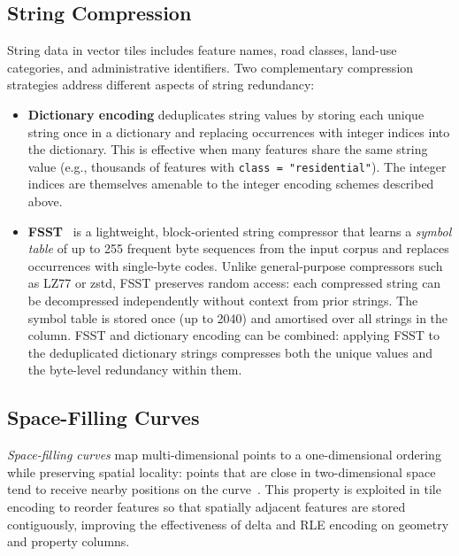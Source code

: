 \subsection{String Compression}\label{sub_string_compression}

String data in vector tiles includes feature names, road classes, land-use categories, and administrative identifiers.
Two complementary compression strategies address different aspects of string redundancy:

\begin{itemize}
    \item \textbf{Dictionary encoding} deduplicates string values by storing each unique string once in a dictionary and replacing occurrences with integer indices into the dictionary.
    This is effective when many features share the same string value (e.g., thousands of features with \texttt{class = "residential"}).
    The integer indices are themselves amenable to the integer encoding schemes described above.

    \item \textbf{\acf{FSST}}~\cite{bonczFSSTFastRandom2020} is a lightweight, block-oriented string compressor that learns a \emph{symbol table} of up to 255 frequent byte sequences from the input corpus and replaces occurrences with single-byte codes.
    Unlike general-purpose compressors such as LZ77 or zstd, \ac{FSST} preserves random access: each compressed string can be decompressed independently without context from prior strings.
    The symbol table is stored once (up to \qty{2040}{\byte}) and amortised over all strings in the column.
    \ac{FSST} and dictionary encoding can be combined: applying \ac{FSST} to the deduplicated dictionary strings compresses both the unique values and the byte-level redundancy within them.
\end{itemize}

\subsection{Space-Filling Curves}\label{sub_space_filling_curves}

\emph{Space-filling curves} map multi-dimensional points to a one-dimensional ordering while preserving spatial locality: points that are close in two-dimensional space tend to receive nearby positions on the curve~\cite{moonAnalysisClusteringProperties2001}.
This property is exploited in tile encoding to reorder features so that spatially adjacent features are stored contiguously, improving the effectiveness of delta and \ac{RLE} encoding on geometry and property columns.

